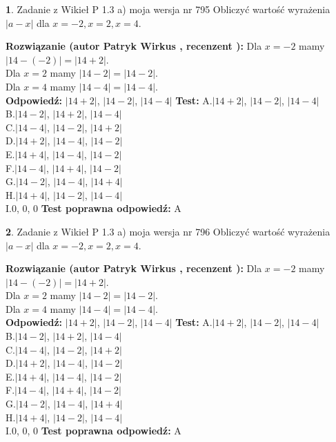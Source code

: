 \documentclass[12pt, a4paper]{article}
\theoremstyle{definition} %
\newtheorem{zad}{}
\newcommand{\zadStart}[1]{\begin{zad}#1\newline}
\newcommand{\zadStop}{\end{zad}}
\newcommand{\rozwStart}[2]{\noindent \textbf{Rozwiązanie (autor #1 , recenzent #2): }\newline}
\newcommand{\rozwStop}{\newline}
\newcommand{\odpStart}{\noindent \textbf{Odpowiedź:}\newline}
\newcommand{\odpStop}{\newline}
\newcommand{\testStart}{\noindent \textbf{Test:}\newline}
\newcommand{\testStop}{\newline}
\newcommand{\kluczStart}{\noindent \textbf{Test poprawna odpowiedź:}\newline}
\newcommand{\kluczStop}{\newline}
\begin{document}
\zadStart{Zadanie z Wikieł P 1.3 a) moja wersja nr 795}
Obliczyć wartość wyrażenia $|a - x|$ dla $x=-2,x=2,x=4$.
\zadStop
\rozwStart{Patryk Wirkus}{}
Dla $x = -2$ mamy $|14 - (-2)| = |14 + 2|$.\\
Dla $x = 2$ mamy $|14 - 2| = |14 - 2|$.\\
Dla $x = 4$ mamy $|14 - 4| = |14 - 4|$.\\
\rozwStop
\odpStart
$|14 + 2|$, $|14 - 2|$, $|14 - 4|$
\odpStop
\testStart
A.$|14 + 2|$, $|14 - 2|$, $|14 - 4|$\\
B.$|14 - 2|$, $|14 + 2|$, $|14 - 4|$\\
C.$|14 - 4|$, $|14 - 2|$, $|14 + 2|$\\
D.$|14 + 2|$, $|14 - 4|$, $|14 - 2|$\\
E.$|14 + 4|$, $|14 - 4|$, $|14 - 2|$\\
F.$|14 - 4|$, $|14 + 4|$, $|14 - 2|$\\
G.$|14 - 2|$, $|14 - 4|$, $|14 + 4|$\\
H.$|14 + 4|$, $|14 - 2|$, $|14 - 4|$\\
I.$0$, $0$, $0$
\testStop
\kluczStart
A
\kluczStop



\zadStart{Zadanie z Wikieł P 1.3 a) moja wersja nr 796}
Obliczyć wartość wyrażenia $|a - x|$ dla $x=-2,x=2,x=4$.
\zadStop
\rozwStart{Patryk Wirkus}{}
Dla $x = -2$ mamy $|14 - (-2)| = |14 + 2|$.\\
Dla $x = 2$ mamy $|14 - 2| = |14 - 2|$.\\
Dla $x = 4$ mamy $|14 - 4| = |14 - 4|$.\\
\rozwStop
\odpStart
$|14 + 2|$, $|14 - 2|$, $|14 - 4|$
\odpStop
\testStart
A.$|14 + 2|$, $|14 - 2|$, $|14 - 4|$\\
B.$|14 - 2|$, $|14 + 2|$, $|14 - 4|$\\
C.$|14 - 4|$, $|14 - 2|$, $|14 + 2|$\\
D.$|14 + 2|$, $|14 - 4|$, $|14 - 2|$\\
E.$|14 + 4|$, $|14 - 4|$, $|14 - 2|$\\
F.$|14 - 4|$, $|14 + 4|$, $|14 - 2|$\\
G.$|14 - 2|$, $|14 - 4|$, $|14 + 4|$\\
H.$|14 + 4|$, $|14 - 2|$, $|14 - 4|$\\
I.$0$, $0$, $0$
\testStop
\kluczStart
A
\kluczStop
\end{document}
